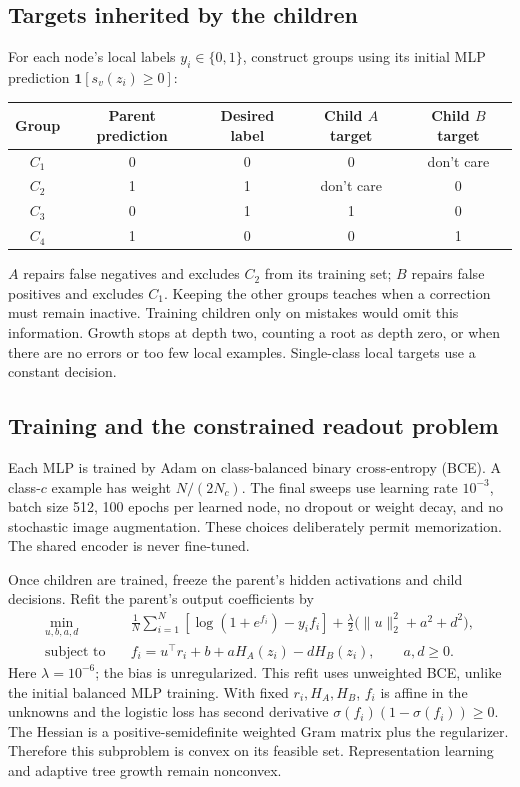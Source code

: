 \documentclass[11pt,a4paper]{article}
\newcommand{\ind}{\mathbf{1}}
\begin{document}
\subsection{Targets inherited by the children}\label{sec:targets}
For each node's local labels $y_i\in\{0,1\}$, construct groups using its initial MLP prediction $\ind[s_v(z_i)\geq0]$:
\begin{center}
\begin{tabular}{ccccc}\toprule
Group & Parent prediction & Desired label & Child $A$ target & Child $B$ target\\\midrule
$C_1$ & 0 & 0 & 0 & don't care\\
$C_2$ & 1 & 1 & don't care & 0\\
$C_3$ & 0 & 1 & 1 & 0\\
$C_4$ & 1 & 0 & 0 & 1\\\bottomrule
\end{tabular}
\end{center}
$A$ repairs false negatives and excludes $C_2$ from its training set; $B$ repairs false positives and excludes $C_1$. Keeping the other groups teaches when a correction must remain inactive. Training children only on mistakes would omit this information. Growth stops at depth two, counting a root as depth zero, or when there are no errors or too few local examples. Single-class local targets use a constant decision.

\subsection{Training and the constrained readout problem}
Each MLP is trained by Adam on class-balanced binary cross-entropy (BCE). A class-$c$ example has weight $N/(2N_c)$. The final sweeps use learning rate $10^{-3}$, batch size 512, 100 epochs per learned node, no dropout or weight decay, and no stochastic image augmentation. These choices deliberately permit memorization. The shared encoder is never fine-tuned.

Once children are trained, freeze the parent's hidden activations and child decisions. Refit the parent's output coefficients by
\begin{align}
\min_{u,b,a,d}\quad &\frac1N\sum_{i=1}^{N}\left[\log(1+e^{f_i})-y_if_i\right]
 +\frac{\lambda}{2}\bigl(\|u\|_2^2+a^2+d^2\bigr),\label{eq:refit}\\
\text{subject to}\quad &f_i=u^\top r_i+b+aH_A(z_i)-dH_B(z_i),\qquad a,d\geq0.
\end{align}
Here $\lambda=10^{-6}$; the bias is unregularized. This refit uses unweighted BCE, unlike the initial balanced MLP training. With fixed $r_i,H_A,H_B$, $f_i$ is affine in the unknowns and the logistic loss has second derivative $\sigma(f_i)(1-\sigma(f_i))\geq0$. The Hessian is a positive-semidefinite weighted Gram matrix plus the regularizer. Therefore this subproblem is convex on its feasible set. Representation learning and adaptive tree growth remain nonconvex.
\end{document}
